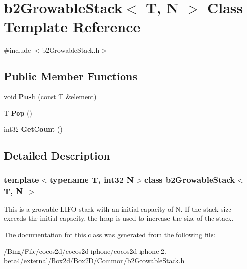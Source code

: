\hypertarget{classb2_growable_stack}{\section{b2\-Growable\-Stack$<$ T, N $>$ Class Template Reference}
\label{classb2_growable_stack}
}


{\ttfamily \#include $<$b2\-Growable\-Stack.\-h$>$}

\subsection*{Public Member Functions}
\begin{DoxyCompactItemize}
\item 
\hypertarget{classb2_growable_stack_a23661327d64ff72d1ec8d6bcdb6d8992}{void {\bfseries Push} (const T \&element)}\label{classb2_growable_stack_a23661327d64ff72d1ec8d6bcdb6d8992}

\item 
\hypertarget{classb2_growable_stack_a53e53dcd6bff8308405a881f02957bc8}{T {\bfseries Pop} ()}\label{classb2_growable_stack_a53e53dcd6bff8308405a881f02957bc8}

\item 
\hypertarget{classb2_growable_stack_a3049e76ba7182b988450bfe94d30d5aa}{int32 {\bfseries Get\-Count} ()}\label{classb2_growable_stack_a3049e76ba7182b988450bfe94d30d5aa}

\end{DoxyCompactItemize}


\subsection{Detailed Description}
\subsubsection*{template$<$typename T, int32 N$>$class b2\-Growable\-Stack$<$ T, N $>$}

This is a growable L\-I\-F\-O stack with an initial capacity of N. If the stack size exceeds the initial capacity, the heap is used to increase the size of the stack. 

The documentation for this class was generated from the following file\-:\begin{DoxyCompactItemize}
\item 
/\-Bing/\-File/cocos2d/cocos2d-\/iphone/cocos2d-\/iphone-\/2.-\/beta4/external/\-Box2d/\-Box2\-D/\-Common/b2\-Growable\-Stack.\-h\end{DoxyCompactItemize}

